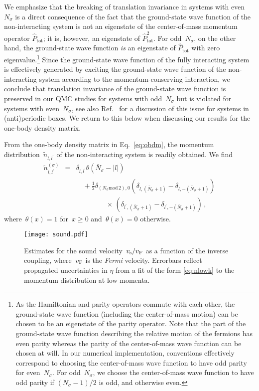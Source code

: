 \documentclass[pra,aps,groupedaddress,floatfix,twocolumn,superscriptaddress,showpacs,nofootinbib]{revtex4-1}
\newcommand{\nn}{\nonumber }
\newcommand{\be}{\begin{eqnarray}}
\newcommand{\ee}{\end{eqnarray}}
\begin{document}
{We emphasize that the breaking of translation invariance in systems with even~$N_{\sigma}$ is a direct consequence
of the fact that the ground-state wave function of the non-interacting system is not
an eigenstate of the center-of-mass momentum operator $\hat P_\text{tot}$; it is, however, an eigenstate of $\hat P^2_\text{tot}$.
For odd~$N_{\sigma}$, on the other hand, the ground-state wave function
{\it is} an eigenstate of $\hat P_\text{tot}$ with zero {eigenvalue.\footnote{As the Hamiltonian and
parity operators commute with each other, the ground-state wave function (including the center-of-mass motion) can be chosen to be
an eigenstate of the parity operator.
Note that the part of the ground-state wave function describing the relative motion of the fermions has even parity whereas the parity
of the center-of-mass wave function can be chosen at will. In our numerical implementation, conventions effectively correspond
to choosing the center-of-mass wave function to have odd parity for even~$N_{\sigma}$. For odd~$N_{\sigma}$,
we choose the center-of-mass wave function to have odd parity if $(N_{\sigma}-1)/2$ is odd, and otherwise even.}}
Since the ground-state
wave function of the fully interacting system is effectively generated by exciting the ground-state
wave function of the non-interacting system according to the momentum-conserving interaction,
we conclude that translation invariance of the ground-state wave function
is preserved in our QMC studies for systems with odd~$N_{\sigma}$ but is violated
for systems with even~$N_{\sigma}$, see also Ref.~\cite{Kemler:2016wci} for a
discussion of this issue for systems in
(anti)periodic boxes.
We return to this below when discussing
our results for the one-body density matrix.

From the one-body density matrix in Eq.~\eqref{eq:obdm}, the
momentum distribution~$\tilde{n}_{l,l^{\prime}}$ of the non-interacting system is readily obtained. We find
%
\be
\tilde{n}^{(\sigma)}_{l,l^{\prime}} &=& \delta_{l,l^{\prime}}\theta( \bar{N}_{\sigma} - |l| ) \nn\\
&&  \quad + \frac{1}{2}\delta_{(N_{\sigma}\text{mod}\, 2), 0}\left( \delta_{l,(\bar{N}_{\sigma}+1)} - \delta_{l,-(\bar{N}_{\sigma}+1)}\right)\nn\\
&& \qquad\qquad\;\times\,
 \left( \delta_{l^{\prime},(\bar{N}_{\sigma}+1)} - \delta_{l^{\prime},-(\bar{N}_{\sigma}+1)}\right)\,,
 \label{eq:nkkni}
\ee
%
where~$\theta(x)=1$ for~$x\geq 0$ and~$\theta(x)=0$ otherwise.
%
\begin{figure}[t]
  \texttt{[image: sound.pdf]}
  \caption{Estimates for the sound velocity~$v_{\rm s}/v_{\rm F}$ as a function of the inverse
  {coupling, where~$v_{\rm F}$ is} the {\it Fermi} velocity. {Errorbars reflect propagated uncertainties in $\eta$ from a fit of the form \eqref{eq:nlowk} to the momentum distribution at low momenta.}}
  \label{Fig:sound}
\end{figure}
%

}
\end{document}
